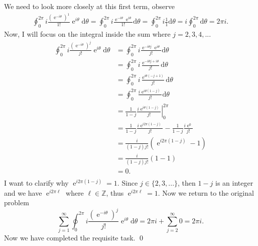 \documentclass[10pt]{amsart}
\newcommand{\D}{\mathrm{d}}
\DeclareMathOperator{\E}{e}
\theoremstyle{nonumberplain}
\begin{document}
\begin{enumerate}[label={\bf {\arabic*}:}]
$$$$
We need to look more closely at this first term, observe
\begin{align*}
\oint_0^{2\pi} i \frac{\left(\E^{-i\theta}\right)^1}{1!} \E^{i\theta} \D \theta = \oint_0^{2\pi} i \frac{\E^{-i\theta}\E^{i\theta}}{1!} \D \theta = \oint_0^{2\pi} i \frac{1}{1} \D \theta = i\oint_0^{2\pi}\D \theta = 2\pi i.
\end{align*}
Now, I will focus on the integral inside the sum where $j = 2, 3, 4, ...$
\begin{align*}
\oint_0^{2\pi} i \frac{\left(\E^{-i\theta}\right)^j}{j!} {\E^{i\theta}} \D \theta &= \oint_0^{2\pi} i \frac{\E^{-i\theta j}\E^{i\theta}}{j!} \D \theta \\
	&= \oint_0^{2\pi} i \frac{\E^{-i\theta j + i\theta}}{j!} \D \theta \\
	&=\oint_0^{2\pi} i \frac{\E^{i\theta\left( - j + 1\right)}}{j!} \D \theta \\
	&=\oint_0^{2\pi} \frac{i\E^{i\theta\left(1 - j\right)}}{j!} \D \theta \\
	&= \left. \frac{1}{1 - j} \frac{i\E^{i\theta\left(1 - j\right)}}{j!} \right|_0^{2 \pi} \\
	&= \frac{1}{1 - j} \frac{i\E^{i2\pi\left(1 - j\right)}}{j!} - \frac{1}{1 - j} \frac{i\E^0}{j!} \\
	&= \frac{i}{\left(1 - j\right)j!}\left(\E^{i2\pi\left(1 - j\right)} - 1 \right) \\
	&= \frac{i}{\left(1 - j\right)j!}\left(1 - 1 \right) \\
	&= 0. \\
\end{align*}
I want to clarify why $\E^{i2\pi\left(1 - j\right)} = 1$.
Since $j \in \{2, 3, ...\}$, then $1 - j$ is an integer and we have $\E^{i2\pi \ell}$ where $\ell \in \mathbb Z$, thus $\E^{i2\pi \ell} = 1$.
Now we return to the original problem
$$
\sum_{j=1}^{\infty} \oint_0^{2\pi} i \frac{\left(\E^{-i\theta}\right)^j}{j!} {\E^{i\theta}} \D \theta =  2\pi i + \sum_{j=2}^{\infty} 0 = 2\pi i.
$$
Now we have completed the requisite task.
\qed
\\


\end{enumerate}
\end{document}
